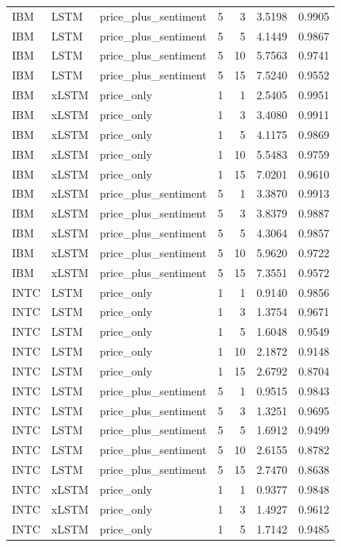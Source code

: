 \begin{longtable}{lllrrrr}
IBM & LSTM & price_plus_sentiment & 5 & 3 & 3.5198 & 0.9905 \\
IBM & LSTM & price_plus_sentiment & 5 & 5 & 4.1449 & 0.9867 \\
IBM & LSTM & price_plus_sentiment & 5 & 10 & 5.7563 & 0.9741 \\
IBM & LSTM & price_plus_sentiment & 5 & 15 & 7.5240 & 0.9552 \\
IBM & xLSTM & price_only & 1 & 1 & 2.5405 & 0.9951 \\
IBM & xLSTM & price_only & 1 & 3 & 3.4080 & 0.9911 \\
IBM & xLSTM & price_only & 1 & 5 & 4.1175 & 0.9869 \\
IBM & xLSTM & price_only & 1 & 10 & 5.5483 & 0.9759 \\
IBM & xLSTM & price_only & 1 & 15 & 7.0201 & 0.9610 \\
IBM & xLSTM & price_plus_sentiment & 5 & 1 & 3.3870 & 0.9913 \\
IBM & xLSTM & price_plus_sentiment & 5 & 3 & 3.8379 & 0.9887 \\
IBM & xLSTM & price_plus_sentiment & 5 & 5 & 4.3064 & 0.9857 \\
IBM & xLSTM & price_plus_sentiment & 5 & 10 & 5.9620 & 0.9722 \\
IBM & xLSTM & price_plus_sentiment & 5 & 15 & 7.3551 & 0.9572 \\
INTC & LSTM & price_only & 1 & 1 & 0.9140 & 0.9856 \\
INTC & LSTM & price_only & 1 & 3 & 1.3754 & 0.9671 \\
INTC & LSTM & price_only & 1 & 5 & 1.6048 & 0.9549 \\
INTC & LSTM & price_only & 1 & 10 & 2.1872 & 0.9148 \\
INTC & LSTM & price_only & 1 & 15 & 2.6792 & 0.8704 \\
INTC & LSTM & price_plus_sentiment & 5 & 1 & 0.9515 & 0.9843 \\
INTC & LSTM & price_plus_sentiment & 5 & 3 & 1.3251 & 0.9695 \\
INTC & LSTM & price_plus_sentiment & 5 & 5 & 1.6912 & 0.9499 \\
INTC & LSTM & price_plus_sentiment & 5 & 10 & 2.6155 & 0.8782 \\
INTC & LSTM & price_plus_sentiment & 5 & 15 & 2.7470 & 0.8638 \\
INTC & xLSTM & price_only & 1 & 1 & 0.9377 & 0.9848 \\
INTC & xLSTM & price_only & 1 & 3 & 1.4927 & 0.9612 \\
INTC & xLSTM & price_only & 1 & 5 & 1.7142 & 0.9485 \\

\end{longtable}
